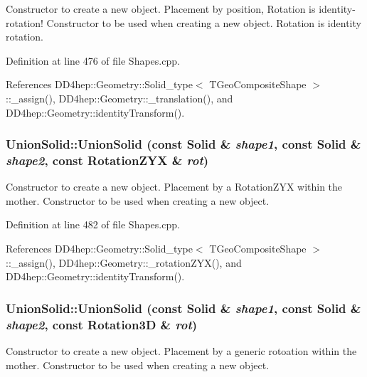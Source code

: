 Constructor to create a new object. Placement by position, Rotation is identity-\/rotation! Constructor to be used when creating a new object. Rotation is identity rotation. 

Definition at line 476 of file Shapes.cpp.

References DD4hep::Geometry::Solid\_\-type$<$ TGeoCompositeShape $>$::\_\-assign(), DD4hep::Geometry::\_\-translation(), and DD4hep::Geometry::identityTransform().\hypertarget{class_d_d4hep_1_1_geometry_1_1_union_solid_a7756c7183422cf3f33cee33b161389e0}{
\subsubsection[{UnionSolid}]{\setlength{\rightskip}{0pt plus 5cm}UnionSolid::UnionSolid (const {\bf Solid} \& {\em shape1}, \/  const {\bf Solid} \& {\em shape2}, \/  const {\bf RotationZYX} \& {\em rot})}}
\label{class_d_d4hep_1_1_geometry_1_1_union_solid_a7756c7183422cf3f33cee33b161389e0}


Constructor to create a new object. Placement by a RotationZYX within the mother. Constructor to be used when creating a new object. 

Definition at line 482 of file Shapes.cpp.

References DD4hep::Geometry::Solid\_\-type$<$ TGeoCompositeShape $>$::\_\-assign(), DD4hep::Geometry::\_\-rotationZYX(), and DD4hep::Geometry::identityTransform().\hypertarget{class_d_d4hep_1_1_geometry_1_1_union_solid_ab24f18730c80761ea9acb96e802242c3}{
\subsubsection[{UnionSolid}]{\setlength{\rightskip}{0pt plus 5cm}UnionSolid::UnionSolid (const {\bf Solid} \& {\em shape1}, \/  const {\bf Solid} \& {\em shape2}, \/  const {\bf Rotation3D} \& {\em rot})}}
\label{class_d_d4hep_1_1_geometry_1_1_union_solid_ab24f18730c80761ea9acb96e802242c3}


Constructor to create a new object. Placement by a generic rotoation within the mother. Constructor to be used when creating a new object. 

